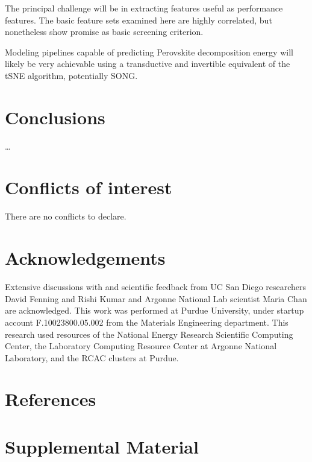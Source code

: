 \documentclass[twoside, twocolumn, 9pt, draft]{article}
\begin{document}
The principal challenge will be in extracting features useful as
performance features. The basic feature sets examined here are highly
correlated, but nonetheless show promise as basic screening criterion.

Modeling pipelines capable of predicting Perovskite decomposition
energy will likely be very achievable using a transductive and
invertible equivalent of the tSNE algorithm, potentially SONG.

\section*{Conclusions}
\label{sec:org50d4ca4}
\ldots{}\\

\section*{Conflicts of interest}
\label{sec:orgda2f0a0}
There are no conflicts to declare.

\section*{Acknowledgements}
\label{sec:orge308b07}
Extensive discussions with and scientific feedback from UC San Diego
researchers David Fenning and Rishi Kumar and Argonne National Lab
scientist Maria Chan are acknowledged. This work was performed at Purdue
University, under startup account F.10023800.05.002 from the Materials
Engineering department. This research used resources of the National
Energy Research Scientific Computing Center, the Laboratory Computing
Resource Center at Argonne National Laboratory, and the RCAC clusters at
Purdue.

\section*{References}
\label{sec:org798ad3a}


\section*{Supplemental Material}
\label{sec:org8f7c997}
\end{document}
